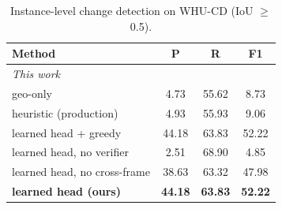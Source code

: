 \begin{table}[t]
\centering
\caption{Instance-level change detection on WHU-CD (IoU $\geq$ 0.5).}
\label{tab:whu_cd_instance}
\setlength{\tabcolsep}{4pt}
\begin{tabular}{lccc}
\toprule
Method & P & R & F1 \\
\midrule
\multicolumn{4}{l}{\emph{This work}} \\
geo-only & 4.73 & 55.62 & 8.73 \\
heuristic (production) & 4.93 & 55.93 & 9.06 \\
learned head + greedy & 44.18 & 63.83 & 52.22 \\
learned head, no verifier & 2.51 & 68.90 & 4.85 \\
learned head, no cross-frame & 38.63 & 63.32 & 47.98 \\
\textbf{learned head (ours)} & \textbf{44.18} & \textbf{63.83} & \textbf{52.22} \\
\bottomrule
\end{tabular}
\end{table}

